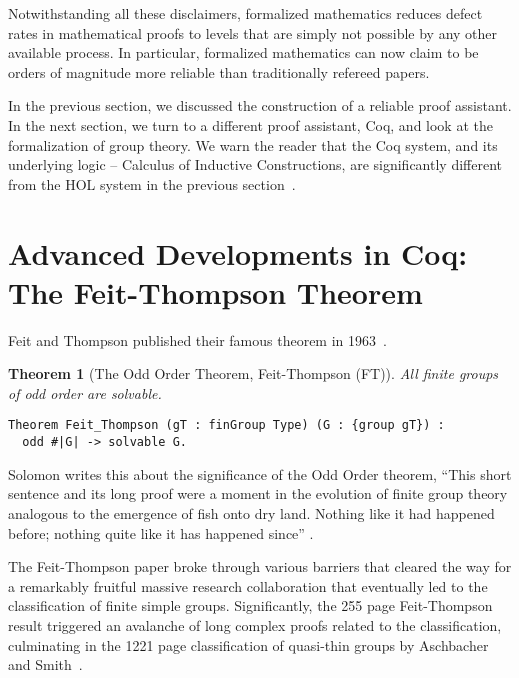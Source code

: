 \documentclass[brochure,english,12pt]{bourbaki}
\theoremstyle{plain}
\newtheorem{theorem}[equation]{Theorem}
\begin{document}
Notwithstanding all these disclaimers,  formalized mathematics reduces defect rates
in mathematical proofs to levels that are simply not possible by any other available process.
In particular, formalized mathematics can now claim to be orders of magnitude more reliable than 
traditionally refereed papers.  


In the previous section, we discussed the construction of a reliable proof assistant.  In the next section,
we turn to a different proof assistant, Coq, and look at the formalization of group theory.
We warn the reader that the Coq system, and its underlying logic -- Calculus of Inductive Constructions, 
are significantly different from the HOL system in the previous section~\cite{CiC}.


\section{Advanced Developments in Coq: The Feit-Thompson Theorem}


Feit and Thompson published their famous theorem in 1963~\cite{FT}.

\begin{theorem}[The Odd Order Theorem, Feit-Thompson (FT)]  All finite groups of odd order are solvable.
\end{theorem}

\begin{lstlisting}[keepspaces=true,stringstyle=\tt,basicstyle=\small,frame=single,framesep=8pt,mathescape,morekeywords={Theorem},columns=flexible]
Theorem Feit_Thompson (gT : finGroup Type) (G : {group gT}) :
  odd #|G| -> solvable G.
\end{lstlisting}

Solomon writes this about the significance of the Odd Order theorem, ``This short sentence and its long proof
were a moment in the evolution of finite group theory analogous to the emergence of fish onto dry
land.  Nothing like it had happened before; nothing quite like it has happened since'' \cite{Sol01}.

The Feit-Thompson paper broke through various barriers that cleared the way for a 
remarkably fruitful massive research collaboration that eventually led to the classification
of finite simple groups.  Significantly, the  255 page Feit-Thompson result
triggered an avalanche of long complex proofs related to the classification, 
culminating in the 1221 page classification of quasi-thin groups by Aschbacher and Smith~\cite{aschbacher2004classification}.
\end{document}
